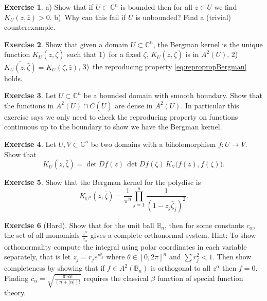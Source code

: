 \documentclass[12pt,openany]{book}
\newcommand{\abs}[1]{\left\lvert {#1} \right\rvert}
\newcommand{\C}{{\mathbb{C}}}
\newcommand{\D}{{\mathbb{D}}}
\newcommand{\bB}{{\mathbb{B}}}
\theoremstyle{plain}
\theoremstyle{remark}
\theoremstyle{definition}
\newenvironment{exbox}{%
    \def\FrameCommand{\vrule width 1pt \relax\hspace {10pt}}%
    \MakeFramed {\advance \hsize -\width \FrameRestore }%
}{%
    \endMakeFramed
}
\theoremstyle{exercise}
\newtheorem{exercise}{Exercise}[section]
\theoremstyle{example}
\begin{document}
\begin{exbox}
\begin{exercise}
a) Show that if $U \subset \C^n$ is bounded then for all $z \in U$
we find $K_U(z,\bar{z}) > 0$. b)~Why can this fail if $U$ is unbounded?
Find a (trivial) counterexample.
\end{exercise}

\begin{exercise}
Show that given a domain $U \subset \C^n$, the Bergman kernel is the unique
function $K_U(z,\bar{\zeta})$ such that
1)~for a fixed $\zeta$, $K_U(z,\bar{\zeta})$ is in $A^2(U)$,
2)~$\overline{K_U(z,\bar{\zeta})} =
K_U(\zeta,\bar{z})$, 3)~the reproducing property \eqref{eq:repropropBergman}
holds.
\end{exercise}

\begin{exercise}
Let $U \subset \C^n$ be a bounded domain with smooth boundary. Show that the functions
in $A^2(U) \cap C(\overline{U})$ are dense in $A^2(U)$.  In particular this
exercise says we
only need to check the reproducing property on functions continuous up to
the boundary to show we have the Bergman kernel.
\end{exercise}

\begin{exercise}
Let $U, V \subset \C^n$ be two domains with a biholomorphism $f \colon U \to
V$.  Show that
\begin{equation*}
K_U(z,\bar{\zeta}) = \det D f(z) \, \overline{\det D f (\zeta)} \,
K_V\bigl(f(z),\overline{f(\zeta)}\bigr) .
\end{equation*}
\end{exercise}

\begin{exercise}
Show that the Bergman kernel for the polydisc is
\begin{equation*}
K_{\D^n}(z,\bar{\zeta}) =
\frac{1}{\pi^n} \prod_{j=1}^n \frac{1}{{(1-z_j\bar{\zeta}_j)}^2}.
\end{equation*}
\end{exercise}

\begin{exercise}[Hard]
Show that for the unit ball $\bB_n$, then for some constants $c_\alpha$,
the set of all monomials $\frac{z^\alpha}{c_\alpha}$ gives a complete orthonormal
system.  Hint: To show orthonormality
compute the integral using polar coordinates in each variable
separately, that is let $z_j = r_j e^{i\theta_j}$ where $\theta \in
[0,2\pi]^n$ and $\sum r_j^2 < 1$.  Then show completeness by showing that
if $f \in A^2(\bB_n)$ is orthogonal to all $z^\alpha$ then $f = 0$.
Finding $c_\alpha = \sqrt{\frac{\pi^n \alpha!}{(n+\abs{\alpha})!}}$ requires
the classical $\beta$ function of special function theory.
\end{exercise}


\end{exbox}
\end{document}
